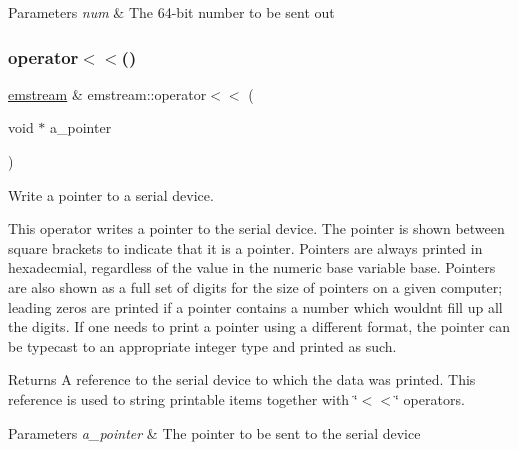 \begin{DoxyParams}{Parameters}
{\em num} & The 64-\/bit number to be sent out \\
\hline
\end{DoxyParams}
\mbox{\label{classemstream_a87d81e918bc1baa294ee9c9c3d056ea7}} 
\subsubsection{\texorpdfstring{operator$<$$<$()}{operator<<()}\hspace{0.1cm}{\footnotesize\ttfamily [11/14]}}
{\footnotesize\ttfamily \mbox{\hyperlink{classemstream}{emstream}} \& emstream\+::operator$<$$<$ (\begin{DoxyParamCaption}\item[{void $\ast$}]{a\+\_\+pointer }\end{DoxyParamCaption})}



Write a pointer to a serial device. 

This operator writes a pointer to the serial device. The pointer is shown between square brackets to indicate that it is a pointer. Pointers are always printed in hexadecmial, regardless of the value in the numeric base variable {\ttfamily base}. Pointers are also shown as a full set of digits for the size of pointers on a given computer; leading zeros are printed if a pointer contains a number which wouldn\textquotesingle{}t fill up all the digits. If one needs to print a pointer using a different format, the pointer can be typecast to an appropriate integer type and printed as such. \begin{DoxyReturn}{Returns}
A reference to the serial device to which the data was printed. This reference is used to string printable items together with \char`\"{}$<$$<$\char`\"{} operators. 
\end{DoxyReturn}

\begin{DoxyParams}{Parameters}
{\em a\+\_\+pointer} & The pointer to be sent to the serial device \\
\hline
\end{DoxyParams}
\mbox{\label{classemstream_ab0ea0ed8ea67a4182d526bdae23d4594}} 
